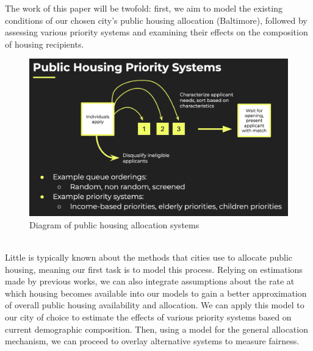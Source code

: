 \documentclass[11pt]{article}
\begin{document}
\newline
The work of this paper will be twofold: first, we aim to model the existing conditions of our chosen city's public housing allocation (Baltimore), followed by assessing various priority systems and examining their effects on the composition of housing recipients. 
\begin{figure}
    \centering
    \includegraphics[width=0.75\linewidth]{schematic_priority _systems.png}
    \caption{Diagram of public housing allocation systems}
    \label{fig:schematic}
\end{figure}
\\
\newline
Little is typically known about the methods that cities use to allocate public housing, meaning our first task is to model this process. %
Relying on estimations made by previous works, we can also integrate assumptions about the rate at which housing becomes available into our models to gain a better approximation of overall public housing availability and allocation. We can apply this model to our city of choice to estimate the effects of various priority systems based on current demographic composition. Then, using a model for the general allocation mechanism, we can proceed to overlay alternative systems to measure fairness. 
\newpage
\end{document}
